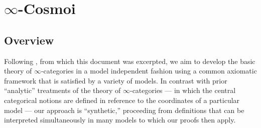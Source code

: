 %

\chapter{\texorpdfstring{$\infty$}{Infinity}-Cosmoi}

\section{Overview}

Following \cite{RiehlVerity:2022eo}, from which this document was excerpted, we aim to develop the basic theory of $\infty$-categories in a model independent fashion using a common axiomatic framework that is satisfied by a variety of models. In contrast with prior ``analytic'' treatments of the theory of $\infty$-categories --- in which the central categorical notions are defined in reference to the coordinates of a particular model --- our approach is ``synthetic,'' proceeding from definitions that can be interpreted simultaneously in many models to which our proofs then apply.

